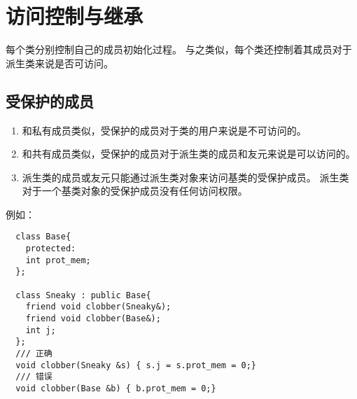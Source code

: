 \section{访问控制与继承}
每个类分别控制自己的成员初始化过程。%
与之类似，每个类还控制着其成员对于派生类来说是否可访问。%
\subsection{受保护的成员}
\begin{enumerate}
\item{和私有成员类似，受保护的成员对于类的用户来说是不可访问的。}
\item{和共有成员类似，受保护的成员对于派生类的成员和友元来说是可以访问的。}
\item{派生类的成员或友元只能通过派生类对象来访问基类的受保护成员。%
    派生类对于一个基类对象的受保护成员没有任何访问权限。
  }
\end{enumerate}
例如：
\begin{lstlisting}
  class Base{
    protected:
    int prot_mem;
  };

  class Sneaky : public Base{
    friend void clobber(Sneaky&);
    friend void clobber(Base&);
    int j;
  };
  /// 正确
  void clobber(Sneaky &s) { s.j = s.prot_mem = 0;}
  /// 错误
  void clobber(Base &b) { b.prot_mem = 0;}
\end{lstlisting}
